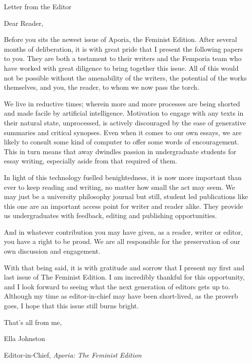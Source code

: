 \vspace*{\credgap}
{\noindent\LARGE\sc Letter from the Editor}
\vspace{\credgap}

\vspace{\ackgap}\noindent
Dear Reader,

\vspace{\credgap}\noindent
Before you sits the newest issue of Aporia, the Feminist Edition. After several months of deliberation, it is with great pride that I present the following papers to you. They are both a testament to their writers and the Femporia team who have worked with great diligence to bring together this issue. All of this would not be possible without the amenability of the writers, the potential of the works themselves, and you, the reader, to whom we now pass the torch.

We live in reductive times; wherein more and more processes are being shorted and made facile by artificial intelligence. Motivation to engage with any texts in their natural state, unprocessed, is actively discouraged by the ease of generative summaries and critical synopses. Even when it comes to our own essays, we are likely to consult some kind of computer to offer some words of encouragement. This in turn means that away dwindles passion in undergraduate students for essay writing, especially aside from that required of them.

In light of this technology fuelled benightedness, it is now more important than ever to keep reading and writing, no matter how small the act may seem. We may just be a university philosophy journal but still, student led publications like this one are an important access point for writer and reader alike. They provide us undergraduates with feedback, editing and publishing opportunities.

And in whatever contribution you may have given, as a reader, writer or editor, you have a right to be proud. We are all responsible for the preservation of our own discussion and engagement.

With that being said, it is with gratitude and sorrow that I present my first and last issue of The Feminist Edition. I am incredibly thankful for this opportunity, and I look forward to seeing what the next generation of editors gets up to. Although my time as editor-in-chief may have been short-lived, as the proverb goes, I hope that this issue still burns bright. 

\vspace{\credgap}\noindent
That’s all from me, 

\vspace{\ackgap}\noindent
Ella Johnston  

\noindent
Editor-in-Chief, \emph{Aporia: The Feminist Edition}
